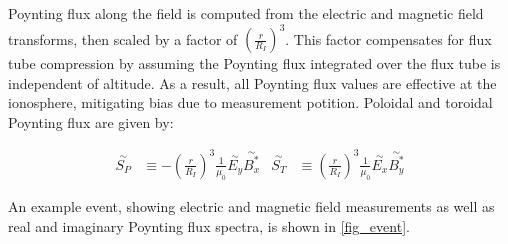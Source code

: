 \documentclass[draft,linenumbers]{agujournal}
\begin{document}
Poynting flux along the field is computed from the electric and magnetic field transforms, then scaled by a factor of $\left( \frac{r}{R_I} \right)^3$. This factor compensates for flux tube compression by assuming the Poynting flux integrated over the flux tube is independent of altitude. As a result, all Poynting flux values are effective at the ionosphere, mitigating bias due to measurement potition. Poloidal and toroidal Poynting flux are given by:
\begin{linenomath*}
\begin{align}
    \overset{\sim}{S_P} &\equiv -\left( \frac{r}{R_I} \right)^3\frac{1}{\mu_0} \overset{\sim}{E_y} \overset{\sim}{B_x^*} &
    \overset{\sim}{S_T} &\equiv  \left( \frac{r}{R_I} \right)^3\frac{1}{\mu_0} \overset{\sim}{E_x} \overset{\sim}{B_y^*}
\end{align}
\end{linenomath*}

An example event, showing electric and magnetic field measurements as well as real and imaginary Poynting flux spectra, is shown in \cref{fig_event}.
\end{document}
